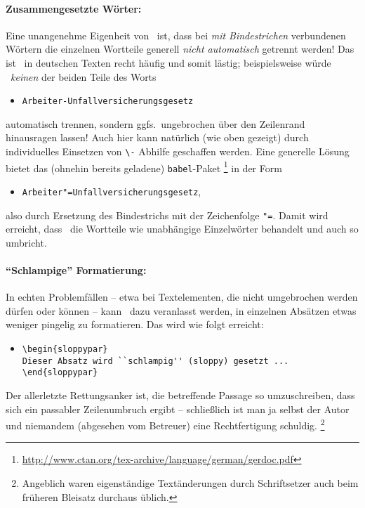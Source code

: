 \paragraph{Zusammengesetzte Wörter:}
Eine unangenehme Eigenheit von \latex\ ist, dass bei \emph{mit Bindestrichen} verbundenen
Wörtern die einzelnen Wortteile generell \emph{nicht automatisch} getrennt werden!
Das ist \va\ in deutschen Texten recht häufig und somit lästig;
beispielsweise würde \latex\ \emph{keinen} der beiden Teile des Worts 
\begin{itemize}
\item[] \verb!Arbeiter-Unfallversicherungsgesetz!
\end{itemize}
automatisch trennen, sondern ggfs.\ ungebrochen über den Zeilenrand hinausragen
lassen! Auch hier kann natürlich (wie oben gezeigt) durch individuelles 
Einsetzen von \verb!\-! Abhilfe geschaffen werden. Eine generelle Lösung bietet das (ohnehin bereits
geladene) \texttt{babel}-Paket%
\footnote{\url{http://www.ctan.org/tex-archive/language/german/gerdoc.pdf}} in der Form
\begin{itemize}
\item[] \verb!Arbeiter"=Unfallversicherungsgesetz!,
\end{itemize}
also durch Ersetzung des Bindestrichs mit der Zeichenfolge \verb!"=!.
Damit wird erreicht, dass \latex\ die Wortteile wie unabhängige Einzelwörter behandelt
und auch so umbricht.

\paragraph{"`Schlampige"' Formatierung:}
In echten Problemfällen -- etwa bei Textelementen, die nicht umgebrochen 
werden dürfen oder können -- kann \latex\ dazu veranlasst werden, in einzelnen Absätzen
etwas weniger pingelig zu formatieren. Das wird wie folgt erreicht:
%
\begin{itemize}
\item[]
\begin{verbatim}
\begin{sloppypar}
Dieser Absatz wird ``schlampig'' (sloppy) gesetzt ...
\end{sloppypar}
\end{verbatim}
\end{itemize}
%
Der allerletzte Rettungsanker ist, die betreffende Passage so umzuschreiben, dass sich ein 
passabler Zeilenumbruch ergibt -- schließlich ist man ja selbst der Autor und 
niemandem (abgesehen vom Betreuer) eine Rechtfertigung schuldig.%
\footnote{Angeblich waren eigenständige Textänderungen durch Schriftsetzer
auch beim früheren Bleisatz durchaus üblich.}





